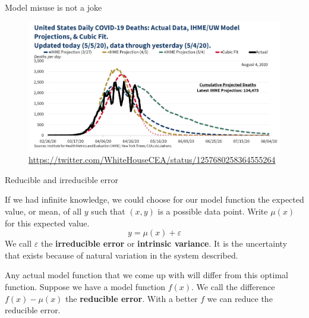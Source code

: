 \documentclass[
  ignorenonframetext,
]{beamer}
\begin{document}
\begin{frame}{Model misuse is not a joke}
\protect\hypertarget{model-misuse-is-not-a-joke}{}

\begin{figure}
\centering
\includegraphics[width=\textwidth,height=0.75\textheight]{covid.jpeg}
\caption{\url{https://twitter.com/WhiteHouseCEA/status/1257680258364555264}}
\end{figure}

\end{frame}

\begin{frame}{Reducible and irreducible error}
\protect\hypertarget{reducible-and-irreducible-error}{}

If we had infinite knowledge, we could choose for our model function the
expected value, or mean, of all \(y\) such that \((x,y)\) is a possible
data point. Write \(\mu(x)\) for this expected value. \[
y=\mu(x)+\varepsilon
\] We call \(\varepsilon\) the \textbf{irreducible error} or
\textbf{intrinsic variance}. It is the uncertainty that exists because
of natural variation in the system described.

Any actual model function that we come up with will differ from this
optimal function. Suppose we have a model function \(f(x)\). We call the
difference \(f(x)-\mu(x)\) the \textbf{reducible error}. With a better
\(f\) we can reduce the reducible error.

\end{frame}
\end{document}
